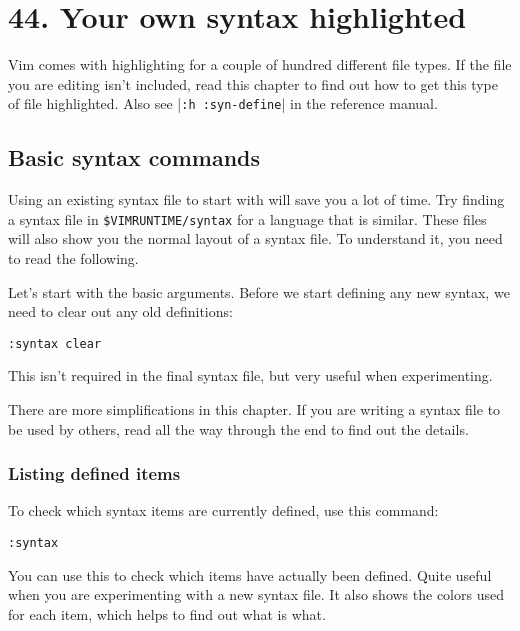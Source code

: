 \section{44. Your own syntax highlighted}
\label{Your own syntax highlighted}
Vim comes with highlighting for a couple of hundred different file types.
If the file you are editing isn't included, read this chapter to find out how to get this type of file highlighted.
Also see |\texttt{:h :syn-define}| in the reference manual.
\localtableofcontents
\subsection{Basic syntax commands}
Using an existing syntax file to start with will save you a lot of time.
Try finding a syntax file in \texttt{\$VIMRUNTIME/syntax} for a language that is similar.
These files will also show you the normal layout of a syntax file.
To understand it, you need to read the following.

Let's start with the basic arguments.
Before we start defining any new syntax, we need to clear out any old definitions:

\begin{Verbatim}[samepage=true]
 :syntax clear
\end{Verbatim}

This isn't required in the final syntax file, but very useful when experimenting.

There are more simplifications in this chapter.
If you are writing a syntax file to be used by others, read all the way through the end to find out the details.

\subsubsection{Listing defined items}
To check which syntax items are currently defined, use this command:

\begin{Verbatim}[samepage=true]
 :syntax
\end{Verbatim}

You can use this to check which items have actually been defined.
Quite useful when you are experimenting with a new syntax file.
It also shows the colors used for each item, which helps to find out what is what.

